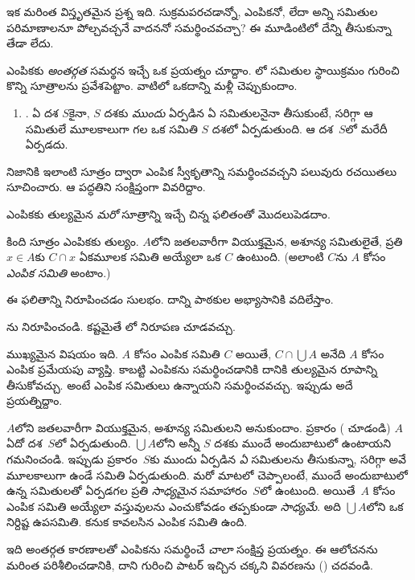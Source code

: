 \documentclass[../../../include/open-logic-section]{subfiles}
\begin{document}

ఇక మరింత విస్తృతమైన ప్రశ్న ఇది. సుక్రమపరచడాన్నో, ఎంపికనో,
లేదా అన్ని సమితుల పరిమాణాలనూ పోల్చవచ్చనే వాదననో
సమర్థించవచ్చా? ఈ మూడింటిలో దేన్ని తీసుకున్నా తేడా లేదు.

ఎంపికకు \emph{అంతర్గత} సమర్థన ఇచ్చే ఒక ప్రయత్నం చూద్దాం.
లో సమితుల స్థాయిక్రమం గురించి కొన్ని సూత్రాలను
ప్రవేశపెట్టాం. వాటిలో ఒకదాన్ని మళ్లీ చెప్పుకుందాం.
\begin{enumerate}
	\item[] \stagesacc. ఏ దశ $S$కైనా, $S$ దశకు \emph{ముందు} ఏర్పడిన ఏ సమితులనైనా తీసుకుంటే,
	సరిగ్గా ఆ సమితులే మూలకాలుగా గల ఒక సమితి $S$ దశలో ఏర్పడుతుంది.
	ఆ దశ~$S$లో మరేదీ ఏర్పడదు.
\end{enumerate}
నిజానికి ఇలాంటి సూత్రం ద్వారా ఎంపిక స్వీకృతాన్ని సమర్థించవచ్చని పలువురు రచయితలు సూచించారు. ఆ పద్ధతిని సంక్షిప్తంగా వివరిద్దాం.

ఎంపికకు తుల్యమైన \emph{మరో} సూత్రాన్ని ఇచ్చే చిన్న ఫలితంతో మొదలుపెడదాం.

\begin{thm}[$\ZF$లో]
కింది సూత్రం ఎంపికకు తుల్యం. $A$లోని
 జతలవారీగా వియుక్తమైన, అశూన్య
సమితులైతే, ప్రతి $x \in A$కు $C \cap x$ ఏకమూలక సమితి అయ్యేలా
ఒక $C$ ఉంటుంది. (అలాంటి $C$ను $A$ కోసం \emph{ఎంపిక సమితి} అంటాం.)
\end{thm}

ఈ ఫలితాన్ని నిరూపించడం సులభం. దాన్ని పాఠకుల అభ్యాసానికి వదిలేస్తాం.

\begin{prob}
ను నిరూపించండి. కష్టమైతే \cite[pp.~242--3]{Potter2004}లో నిరూపణ చూడవచ్చు.
\end{prob}

ముఖ్యమైన విషయం ఇది. $A$ కోసం ఎంపిక సమితి $C$ అయితే,
$C \cap \bigcup A$ అనేది $A$ కోసం ఎంపిక ప్రమేయపు వ్యాప్తి.
కాబట్టి ఎంపికను సమర్థించడానికి దానికి తుల్యమైన రూపాన్ని తీసుకోవచ్చు. అంటే ఎంపిక
సమితులు ఉన్నాయని సమర్థించవచ్చు. ఇప్పుడు అదే ప్రయత్నిద్దాం.

$A$లోని  జతలవారీగా వియుక్తమైన, అశూన్య సమితులని అనుకుందాం. \stageshier{} ప్రకారం ( చూడండి) $A$ ఏదో దశ~$S$లో ఏర్పడుతుంది. $\bigcup A$లోని  అన్నీ $S$ దశకు ముందే అందుబాటులో ఉంటాయని గమనించండి.
ఇప్పుడు \stagesacc{} ప్రకారం~$S$కు ముందు ఏర్పడిన
\emph{ఏ} సమితులను తీసుకున్నా, సరిగ్గా అవే మూలకాలుగా
ఉండే సమితి ఏర్పడుతుంది. మరో మాటలో చెప్పాలంటే, ముందే
అందుబాటులో ఉన్న సమితులతో ఏర్పడగల ప్రతి \emph{సాధ్యమైన}
సమాహారం~$S$లో ఉంటుంది. అయితే~$A$ కోసం ఎంపిక సమితి
అయ్యేలా వస్తువులను ఎంచుకోవడం తప్పకుండా \emph{సాధ్యమే}.
అది $\bigcup A$లోని ఒక నిర్దిష్ట ఉపసమితి. కనుక
కావలసిన ఎంపిక సమితి ఉంది.

ఇది అంతర్గత కారణాలతో ఎంపికను సమర్థించే \emph{చాలా} సంక్షిప్త ప్రయత్నం. ఈ ఆలోచనను మరింత పరిశీలించడానికి, దాని గురించి పాటర్ ఇచ్చిన చక్కని వివరణను (\citeyear[\S14.8]{Potter2004}) చదవండి.
\end{document}
